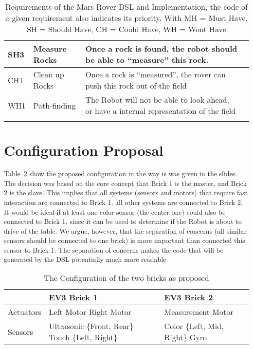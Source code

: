 \documentclass{scrartcl}
\begin{document}
\begin{longtable}{|l|p{1.7cm}|p{5cm}|p{5cm}|}
	SH3 & Measure Rocks & Once a rock is found, the robot should be able to ``measure'' this rock. & \\\hline
	CH1 & Clean up Rocks & Once a rock is ``measured'', the rover can push this rock out of the field & \\\hline
	WH1 & Path-finding & The Robot will not be able to look ahead, or have a internal representation of the field & \\\hline
\caption{Requirements of the Mars Rover DSL and Implementation, the code of a given requirement also indicates its priority. With MH = Must Have, SH = Should Have, CH = Could Have, WH = Wont Have}
\label{tab:requirements}
\end{longtable}

\section{Configuration Proposal}
Table~\ref{tab:config} show the proposed configuration in the way is was given in the slides.
The decision was based on the core concept that Brick 1 is the master, and Brick 2 is the slave.
This implies that all systems (sensors and motors) that require fast interaction are connected to Brick 1, all other systems are connected to Brick 2.
It would be ideal if at least one color sensor (the center one) could also be connected to Brick 1, since it can be used to determine if the Robot is about to drive of the table.
We argue, however, that the separation of concerns (all similar sensors should be connected to one brick) is more important than connected this sensor to Brick 1.
The separation of concerns makes the code that will be generated by the DSL potentially much more readable.
\begin{table}
	\centering
	\begin{tabular}{|l|p{5cm}|p{5cm}|}
		\hline
		& EV3 Brick 1 & EV3 Brick 2 \\\hline
		Actuators & Left Motor \newline Right Motor & Measurement Motor \\\hline
		Sensors & Ultrasonic \{Front, Rear\} \newline Touch \{Left, Right\} & Color \{Left, Mid, Right\} \newline Gyro \\\hline
	\end{tabular}
	\caption{The Configuration of the two bricks as proposed}
	\label{tab:config}
\end{table}
\end{document}
